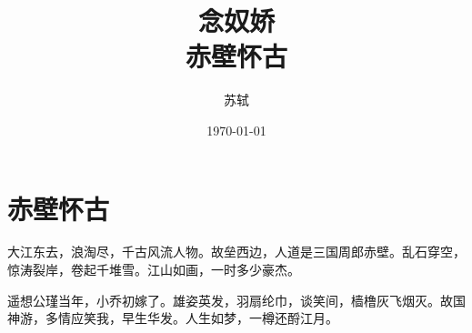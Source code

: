 \documentclass[UTF8]{ctexart}
\title{\heiti 念奴娇\\赤壁怀古}
\author{\kaishu 苏轼}
\date{\today}
\begin{document}
\maketitle 

\tableofcontents 

\newpage
\section{赤壁怀古}
大江东去，浪淘尽，千古风流人物。故垒西边，人道是三国周郎赤壁。乱石穿空，惊涛裂岸，卷起千堆雪。江山如画，一时多少豪杰。

遥想公瑾当年，小乔初嫁了。雄姿英发，羽扇纶巾，谈笑间，樯橹灰飞烟灭。故国神游，多情应笑我，早生华发。人生如梦，一樽还酹江月。
\end{document}
